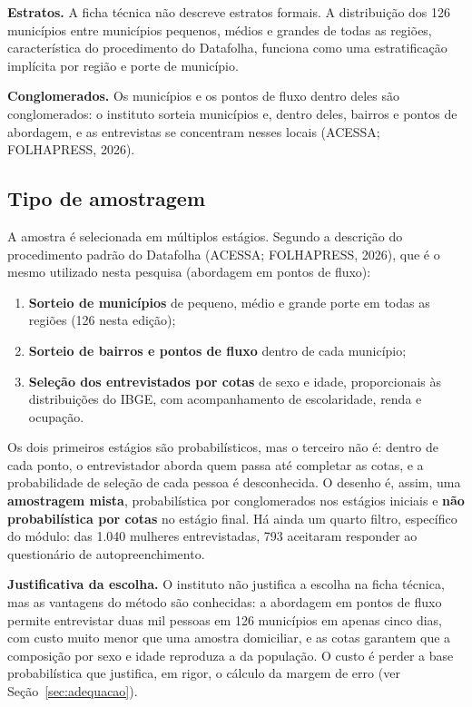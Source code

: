 \documentclass[12pt,a4paper]{article}
\begin{document}
\textbf{Estratos.} A ficha técnica não descreve estratos formais. A distribuição dos 126 municípios entre municípios pequenos, médios e grandes de todas as regiões, característica do procedimento do Datafolha, funciona como uma estratificação implícita por região e porte de município.

\textbf{Conglomerados.} Os municípios e os pontos de fluxo dentro deles são conglomerados: o instituto sorteia municípios e, dentro deles, bairros e pontos de abordagem, e as entrevistas se concentram nesses locais (ACESSA; FOLHAPRESS, 2026).

\subsection{Tipo de amostragem}

A amostra é selecionada em múltiplos estágios. Segundo a descrição do procedimento padrão do Datafolha (ACESSA; FOLHAPRESS, 2026), que é o mesmo utilizado nesta pesquisa (abordagem em pontos de fluxo):

\begin{enumerate}
    \item \textbf{Sorteio de municípios} de pequeno, médio e grande porte em todas as regiões (126 nesta edição);
    \item \textbf{Sorteio de bairros e pontos de fluxo} dentro de cada município;
    \item \textbf{Seleção dos entrevistados por cotas} de sexo e idade, proporcionais às distribuições do IBGE, com acompanhamento de escolaridade, renda e ocupação.
\end{enumerate}

Os dois primeiros estágios são probabilísticos, mas o terceiro não é: dentro de cada ponto, o entrevistador aborda quem passa até completar as cotas, e a probabilidade de seleção de cada pessoa é desconhecida. O desenho é, assim, uma \textbf{amostragem mista}, probabilística por conglomerados nos estágios iniciais e \textbf{não probabilística por cotas} no estágio final. Há ainda um quarto filtro, específico do módulo: das 1.040 mulheres entrevistadas, 793 aceitaram responder ao questionário de autopreenchimento.

\textbf{Justificativa da escolha.} O instituto não justifica a escolha na ficha técnica, mas as vantagens do método são conhecidas: a abordagem em pontos de fluxo permite entrevistar duas mil pessoas em 126 municípios em apenas cinco dias, com custo muito menor que uma amostra domiciliar, e as cotas garantem que a composição por sexo e idade reproduza a da população. O custo é perder a base probabilística que justifica, em rigor, o cálculo da margem de erro (ver Seção~\ref{sec:adequacao}).
\end{document}
